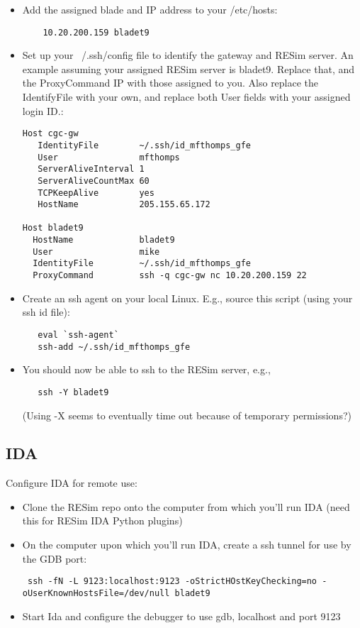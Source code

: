 \documentclass[titlepage]{article}
\begin{document}
\begin{itemize}

\item Add the assigned blade and IP address to your /etc/hosts:
\begin{verbatim}
    10.20.200.159 bladet9
\end{verbatim}

\item Set up your ~/.ssh/config file to identify the gateway and RESim server.  An example
assuming your assigned RESim server is bladet9.  Replace that, and the ProxyCommand IP with 
those assigned to you.  Also replace the IdentifyFile with your own,
and replace both User fields with your assigned login ID.:

\begin{verbatim}
Host cgc-gw
   IdentityFile        ~/.ssh/id_mfthomps_gfe
   User                mfthomps
   ServerAliveInterval 1
   ServerAliveCountMax 60
   TCPKeepAlive        yes
   HostName            205.155.65.172

Host bladet9
  HostName             bladet9
  User                 mike
  IdentityFile         ~/.ssh/id_mfthomps_gfe
  ProxyCommand         ssh -q cgc-gw nc 10.20.200.159 22
\end{verbatim}

\item Create an ssh agent on your local Linux.  E.g., source this script (using
your ssh id file):

\begin{verbatim}
   eval `ssh-agent`
   ssh-add ~/.ssh/id_mfthomps_gfe
\end{verbatim}

\item You should now be able to ssh to the RESim server, e.g., 
\begin{verbatim}
   ssh -Y bladet9
\end{verbatim}
(Using -X seems to eventually time out because of temporary permissions?)

\end{itemize}

\subsection{IDA}
Configure IDA for remote use:
\begin{itemize}
\item Clone the RESim repo onto the computer from which you'll run IDA (need this for RESim
IDA Python plugins)

\item On the computer upon which you'll run IDA, create a ssh tunnel for use by the GDB port:
\begin{verbatim}
 ssh -fN -L 9123:localhost:9123 -oStrictHOstKeyChecking=no -oUserKnownHostsFile=/dev/null bladet9
\end{verbatim}

\item Start Ida and configure the debugger to use gdb, localhost and port 9123
\end{itemize}
\end{document}
